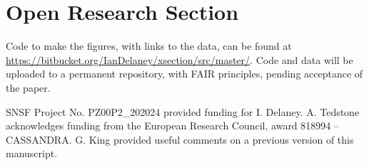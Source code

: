\documentclass[draft]{agujournal2019}
\begin{document}
\section*{Open Research Section}
Code to make the figures, with links to the data, can be found at \url{https://bitbucket.org/IanDelaney/xsection/src/master/}.
Code and data will be uploaded to a permanent repository, with FAIR principles, pending acceptance of the paper.

\acknowledgments

SNSF Project No. PZ00P2\_202024 provided  funding for I. Delaney.
A. Tedstone acknowledges funding from the European Research Council, award 818994 -- CASSANDRA.
G. King provided useful comments on a previous version of this manuscript.




\newpage

\appendix
\end{document}

